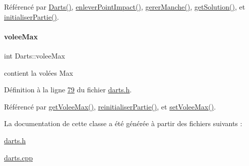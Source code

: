 Référencé par \hyperlink{darts_8cpp_source_l00022}{Darts()}, \hyperlink{darts_8cpp_source_l00274}{enlever\+Point\+Impact()}, \hyperlink{darts_8cpp_source_l00303}{gerer\+Manche()}, \hyperlink{darts_8cpp_source_l00110}{get\+Solution()}, et \hyperlink{darts_8cpp_source_l00144}{initialiser\+Partie()}.

\mbox{\label{class_darts_aed9c6aa8f34fb2dcbc57a5ea24aa6c2a}} 
\paragraph{\texorpdfstring{volee\+Max}{voleeMax}}
{\footnotesize\ttfamily int Darts\+::volee\+Max\hspace{0.3cm}{\ttfamily [private]}}



contient la volées Max 



Définition à la ligne \hyperlink{darts_8h_source_l00079}{79} du fichier \hyperlink{darts_8h_source}{darts.\+h}.



Référencé par \hyperlink{darts_8cpp_source_l00066}{get\+Volee\+Max()}, \hyperlink{darts_8cpp_source_l00184}{reinitialiser\+Partie()}, et \hyperlink{darts_8cpp_source_l00121}{set\+Volee\+Max()}.



La documentation de cette classe a été générée à partir des fichiers suivants \+:\begin{DoxyCompactItemize}
\item 
\hyperlink{darts_8h}{darts.\+h}\item 
\hyperlink{darts_8cpp}{darts.\+cpp}\end{DoxyCompactItemize}

